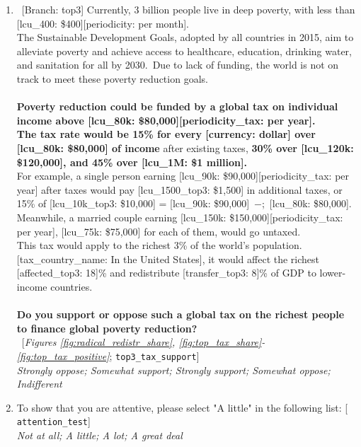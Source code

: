 \begin{enumerate}[resume]
\item ~[Branch: top3] \label{q:top3_tax_support} Currently, 3 billion people live in deep poverty, with less than [lcu\_400: \$400][periodicity: per month].\\The Sustainable Development Goals, adopted by all countries in 2015, aim to alleviate poverty and achieve access to healthcare, education, drinking water, and sanitation for all by 2030.~Due to lack of funding, the world is not on track to meet these poverty reduction goals.\\\\\textbf{Poverty reduction could be funded by a global tax on individual income above [lcu\_80k: \$80,000][periodicity\_tax: per year].~\\The tax rate would be 15\% for every [currency: dollar] over [lcu\_80k: \$80,000] of income} after existing taxes, \textbf{30\% over [lcu\_120k: \$120,000], and 45\% over [lcu\_1M: \$1 million].~}\\For example, a single person earning [lcu\_90k: \$90,000][periodicity\_tax: per year] after taxes would pay [lcu\_1500\_top3: \$1,500] in additional taxes, or 15\% of [lcu\_10k\_top3: \$10,000] = [lcu\_90k: \$90,000]~$-$;~[lcu\_80k: \$80,000]. Meanwhile, a married couple earning [lcu\_150k: \$150,000][periodicity\_tax: per year], [lcu\_75k: \$75,000] for each of them, would go untaxed.\\This tax would apply to the richest 3\% of the world's population. [tax\_country\_name: In the United States], it would affect the richest [affected\_top3: 18]\% and redistribute [transfer\_top3: 8]\% of GDP to lower-income countries.\\\\\textbf{Do you support or oppose such a global tax on the richest people to finance global poverty reduction?}\\ 
~[\textit{Figures \ref{fig:radical_redistr_share}, \ref{fig:top_tax_share}-\ref{fig:top_tax_positive}}; 
\verb|top3_tax_support|]
  \\ \textit{Strongly oppose; Somewhat support; Strongly support; Somewhat oppose; Indifferent}

\item  \label{q:attention_test} To show that you are attentive, please select "A little" in the following list: [%
\verb|attention_test|]
  \\ \textit{Not at all; A little; A lot; A great deal}

\end{enumerate} 

